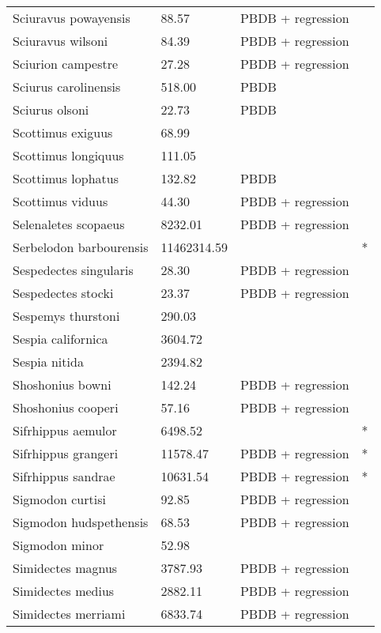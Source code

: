 \documentclass{article}
\begin{document}
\begin{center}
\begin{longtable}{p{} p{} p{} p{}}
    Sciuravus powayensis & 88.57 & PBDB + regression &  \\ 
    Sciuravus wilsoni & 84.39 & PBDB + regression &  \\ 
    Sciurion campestre & 27.28 & PBDB + regression &  \\ 
    Sciurus carolinensis & 518.00 & PBDB &  \\ 
    Sciurus olsoni & 22.73 & PBDB &  \\ 
    Scottimus exiguus & 68.99 & \cite{Novacek1977} &  \\ 
    Scottimus longiquus & 111.05 & \cite{Tomiya2013} &  \\ 
    Scottimus lophatus & 132.82 & PBDB &  \\ 
    Scottimus viduus & 44.30 & PBDB + regression &  \\ 
    Selenaletes scopaeus & 8232.01 & PBDB + regression &  \\ 
    Serbelodon barbourensis & 11462314.59 & \cite{Secord2008a} & * \\ 
    Sespedectes singularis & 28.30 & PBDB + regression &  \\ 
    Sespedectes stocki & 23.37 & PBDB + regression &  \\ 
    Sespemys thurstoni & 290.03 & \cite{Tomiya2013} &  \\ 
    Sespia californica & 3604.72 & \cite{Tomiya2013} &  \\ 
    Sespia nitida & 2394.82 & \cite{VanValkenburgh2007a} &  \\ 
    Shoshonius bowni & 142.24 & PBDB + regression &  \\ 
    Shoshonius cooperi & 57.16 & PBDB + regression &  \\ 
    Sifrhippus aemulor & 6498.52 & \cite{Osborn1933} & * \\ 
    Sifrhippus grangeri & 11578.47 & PBDB + regression & * \\ 
    Sifrhippus sandrae & 10631.54 & PBDB + regression & * \\ 
    Sigmodon curtisi & 92.85 & PBDB + regression &  \\ 
    Sigmodon hudspethensis & 68.53 & PBDB + regression &  \\ 
    Sigmodon minor & 52.98 & \cite{Tomiya2013} &  \\ 
    Simidectes magnus & 3787.93 & PBDB + regression &  \\ 
    Simidectes medius & 2882.11 & PBDB + regression &  \\ 
    Simidectes merriami & 6833.74 & PBDB + regression &  \\ 

\end{longtable}
\end{center}
\end{document}
